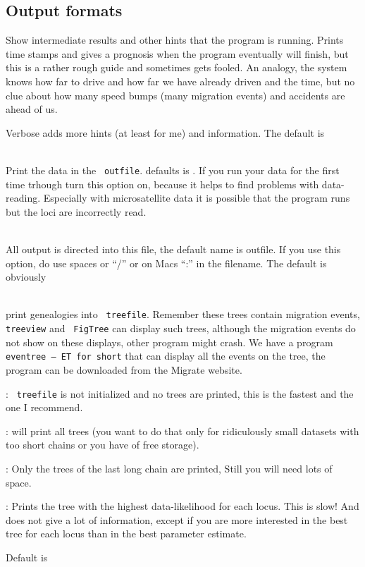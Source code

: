 \subsection{Output formats}
\begin{description}
\item{} 
Show intermediate results and other hints that the program is running.
Prints time stamps and gives a prognosis when the program eventually
will finish, but this is a rather rough guide and sometimes gets fooled.
An analogy, the system knows how far to drive and how far we have 
already driven and the time, but no clue about how many speed bumps 
(many migration events) and accidents are ahead of us.
\par
Verbose adds more hints (at least for me) and information.
The default is {}
\item{} \\
Print the data in the \texttt{ outfile}. defaults is {}. If you run your data for the first time trhough \migrate turn this option on, because it helps to find problems with data-reading. Especially with microsatellite data it is possible that the program runs but the loci are incorrectly read.
\item{}\\
 All output is directed into this file, the default name is outfile. If you use this option, do {} use spaces  or ``/'' or on Macs ``:'' in the filename.
The default is obviously {}

\item{}\\
print genealogies into \texttt{ treefile}. Remember these trees contain
migration events, \texttt{ treeview} \cite{page:1996} and \texttt{ FigTree} \cite{Rambaut:2006} can display such trees, although the migration events
do not show on these displays, other program might crash. We have a program \texttt{ eventree -- ET for short} that can display all the events on the tree, the program can be downloaded from the Migrate website.
\begin{description}

\item{{}:} \texttt{ treefile} is not initialized and no trees are printed, 
this is the fastest and the one I recommend.

\item{{}:}  will print all trees (you want to do that only for ridiculously small datasets with too short chains or you have {} of free storage).
\item{{}:} Only the trees of the last long chain are printed, 
Still you will need lots of space.
\item{{}:} Prints the tree with the highest data-likelihood for each locus.
This is slow! And does not give a lot of information,  except if you are more interested in the best tree for each locus than in the best parameter estimate.
\end{description}
Default is {}


\end{description}
